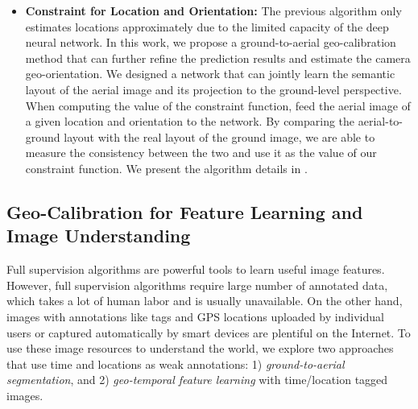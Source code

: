 \begin{itemize}[noitemsep]
  \item \textbf{Constraint for Location and Orientation:}
  The previous algorithm only estimates locations approximately
  due to the limited capacity of the deep neural network. In this
  work, we propose a ground-to-aerial geo-calibration method that can
  further refine the prediction results and estimate the
  camera geo-orientation.
  We designed a network that can jointly learn the semantic layout of
  the aerial image and its projection to the ground-level perspective.
  When computing the value of the constraint function, feed the aerial
  image of a given location and orientation to the network. 
  By comparing the aerial-to-ground layout with the real layout of the
  ground image, we are able to measure the consistency between the two
  and use it as the value of our constraint function.
  We present the algorithm details in .
  \newline

\end{itemize}


\subsection{Geo-Calibration for Feature Learning and Image
Understanding}
Full supervision algorithms are powerful tools to learn useful image
features. However, full supervision algorithms require large number
of annotated data, which takes a lot of human labor and is usually
unavailable.
On the other hand, images with annotations like tags and GPS locations
uploaded by individual users or captured automatically by smart
devices are plentiful on the Internet.
To use these image resources to understand the world,
we explore two approaches that use time and
locations as weak annotations: 1) {\em ground-to-aerial segmentation}, and 2)
{\em geo-temporal feature learning} with time/location tagged images.
 
